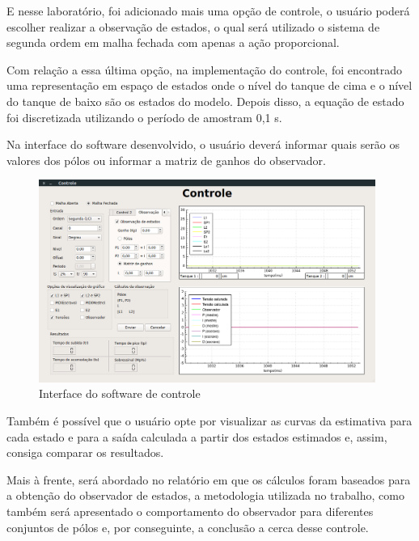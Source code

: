 \documentclass[a4paper,12pt]{article}
\begin{document}
\hspace{4ex}E nesse laboratório, foi adicionado mais uma opção de controle, o usuário poderá escolher realizar a observação de estados, o qual será utilizado o sistema de segunda ordem em malha fechada com apenas a ação proporcional. 

\hspace{4ex}Com relação a essa última opção, na implementação do controle, foi encontrado uma representação em espaço de estados onde o nível do tanque de cima e o nível do tanque de baixo são os estados do modelo. Depois disso, a equação de estado foi discretizada utilizando o período de amostram 0,1 s.

\hspace{4ex}Na interface do software desenvolvido, o usuário deverá informar quais serão os valores dos pólos ou informar a matriz de ganhos do observador.

\begin{figure}[H]
\centering
\includegraphics[width=11cm]{fotosLab5/interfaceObs.png}
\caption{Interface do software de controle}
\label{interface}
\end{figure}

\hspace{4ex}Também é possível que o usuário opte por visualizar as curvas da estimativa para cada estado e para a saída calculada a partir dos estados estimados e, assim, consiga comparar os resultados.

\hspace{4ex}Mais à frente, será abordado no relatório em que os cálculos foram baseados para a obtenção do observador de estados, a metodologia utilizada no trabalho, como também será apresentado o comportamento do observador para diferentes conjuntos de pólos e, por conseguinte, a conclusão a cerca desse controle.

\end{document}
